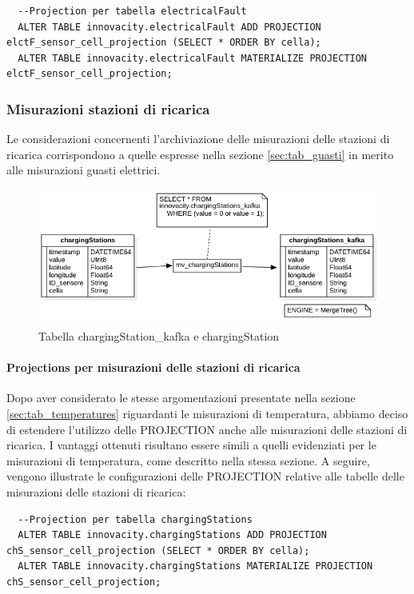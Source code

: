 \begin{lstlisting}
  --Projection per tabella electricalFault
  ALTER TABLE innovacity.electricalFault ADD PROJECTION elctF_sensor_cell_projection (SELECT * ORDER BY cella);
  ALTER TABLE innovacity.electricalFault MATERIALIZE PROJECTION elctF_sensor_cell_projection;
\end{lstlisting}

\subsubsection{Misurazioni stazioni di ricarica} Le considerazioni concernenti l'archiviazione delle misurazioni delle stazioni di ricarica corrispondono a quelle espresse nella sezione \ref{sec:tab_guasti} in merito alle misurazioni guasti elettrici.

\begin{figure}[H]
    \centering
    \includegraphics[width=1\textwidth]{../Images/SpecificaTecnica/chargingStations.png}
    \caption{Tabella chargingStation\_kafka e chargingStation}
    \label{fig:umidities}
  \end{figure}

\paragraph{Projections per misurazioni delle stazioni di ricarica}
Dopo aver considerato le stesse argomentazioni presentate nella sezione \ref{sec:tab_temperatures} riguardanti le misurazioni di temperatura, abbiamo deciso di estendere l'utilizzo delle PROJECTION anche alle misurazioni delle stazioni di ricarica. I vantaggi ottenuti risultano essere simili a quelli evidenziati per le misurazioni di temperatura, come descritto nella stessa sezione. A seguire, vengono illustrate le configurazioni delle PROJECTION relative alle tabelle delle misurazioni delle stazioni di ricarica:

\begin{lstlisting}
  --Projection per tabella chargingStations
  ALTER TABLE innovacity.chargingStations ADD PROJECTION chS_sensor_cell_projection (SELECT * ORDER BY cella);
  ALTER TABLE innovacity.chargingStations MATERIALIZE PROJECTION chS_sensor_cell_projection;
\end{lstlisting}

